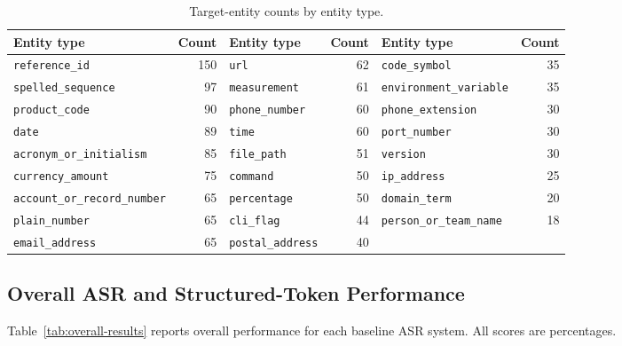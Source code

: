 \documentclass[10pt,twocolumn]{article}
\begin{document}
\begin{table}[t]\centering\footnotesize
	\caption{Target-entity counts by entity type.}\label{tab:entity-counts}
	\begin{tabularx}{\textwidth}{LrLrLr}
		\toprule
		Entity type                          & Count & Entity type              & Count & Entity type                     & Count
		\\
		\midrule
		\texttt{reference\_id}               & 150   & \texttt{url}             & 62    & \texttt{code\_symbol}           & 35
		\\
		\texttt{spelled\_sequence}           & 97    & \texttt{measurement}     & 61    & \texttt{environment\_variable}  & 35
		\\
		\texttt{product\_code}               & 90    & \texttt{phone\_number}   & 60    & \texttt{phone\_extension}       & 30
		\\
		\texttt{date}                        & 89    & \texttt{time}            & 60    & \texttt{port\_number}           & 30
		\\
		\texttt{acronym\_or\_initialism}     & 85    & \texttt{file\_path}      & 51    & \texttt{version}                & 30
		\\
		\texttt{currency\_amount}            & 75    & \texttt{command}         & 50    & \texttt{ip\_address}            & 25
		\\
		\texttt{account\_or\_record\_number} & 65    & \texttt{percentage}      & 50    & \texttt{domain\_term}           & 20
		\\
		\texttt{plain\_number}               & 65    & \texttt{cli\_flag}       & 44    & \texttt{person\_or\_team\_name} & 18
		\\
		\texttt{email\_address}              & 65    & \texttt{postal\_address} & 40    &                                 &
		\\
		\bottomrule
	\end{tabularx}\end{table}

\subsection{Overall ASR and Structured-Token
	Performance}\label{overall-asr-and-structured-token-performance}

Table~\ref{tab:overall-results} reports overall performance for each
baseline ASR system. All scores are percentages.
\end{document}
